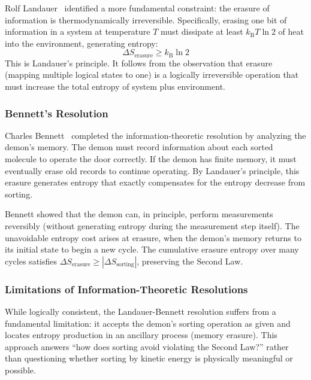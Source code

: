 \documentclass[twocolumn,showpacs,preprintnumbers,amsmath,amssymb,prd]{revtex4-2}
\theoremstyle{definition}
\theoremstyle{remark}
\newcommand{\kB}{k_{\mathrm{B}}}
\begin{document}
Rolf Landauer~\cite{landauer1961irreversibility} identified a more fundamental constraint: the erasure of information is thermodynamically irreversible. Specifically, erasing one bit of information in a system at temperature $T$ must dissipate at least $\kB T \ln 2$ of heat into the environment, generating entropy:
\begin{equation}
\Delta S_{\text{erasure}} \geq \kB \ln 2
\label{eq:landauer}
\end{equation}
This is Landauer's principle. It follows from the observation that erasure (mapping multiple logical states to one) is a logically irreversible operation that must increase the total entropy of system plus environment.

\subsubsection{Bennett's Resolution}

Charles Bennett~\cite{bennett1982thermodynamics} completed the information-theoretic resolution by analyzing the demon's memory. The demon must record information about each sorted molecule to operate the door correctly. If the demon has finite memory, it must eventually erase old records to continue operating. By Landauer's principle, this erasure generates entropy that exactly compensates for the entropy decrease from sorting.

Bennett showed that the demon can, in principle, perform measurements reversibly (without generating entropy during the measurement step itself). The unavoidable entropy cost arises at erasure, when the demon's memory returns to its initial state to begin a new cycle. The cumulative erasure entropy over many cycles satisfies $\Delta S_{\text{erasure}} \geq |\Delta S_{\text{sorting}}|$, preserving the Second Law.

\subsubsection{Limitations of Information-Theoretic Resolutions}

While logically consistent, the Landauer-Bennett resolution suffers from a fundamental limitation: it accepts the demon's sorting operation as given and locates entropy production in an ancillary process (memory erasure). This approach answers ``how does sorting avoid violating the Second Law?'' rather than questioning whether sorting by kinetic energy is physically meaningful or possible.
\end{document}
